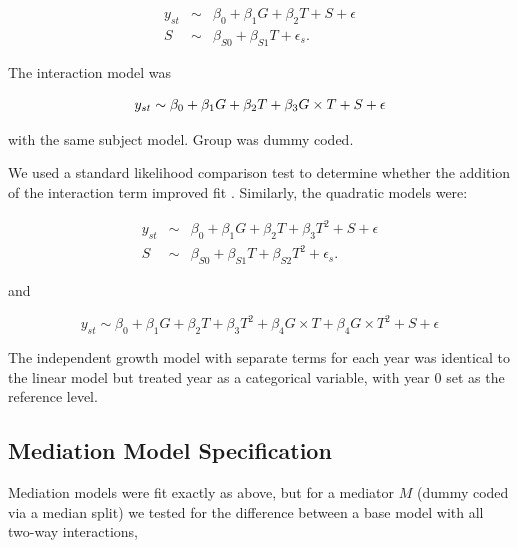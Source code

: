 \documentclass[11pt]{article}
\begin{document}
\begin{eqnarray}
y_{st} &\sim& \beta_{0} + \beta_{1} G + \beta_{2} T + S + \epsilon\\
S &\sim& \beta_{S0} + \beta_{S1} T + \epsilon_{s}.
\end{eqnarray}

\noindent The interaction model was 

\begin{equation}
y_{st} \sim \beta_{0} + \beta_{1} G + \beta_{2} T + \beta_3 G \times T +  S + \epsilon\\
\end{equation}

\noindent with the same subject model. Group was dummy coded. 

We used a standard likelihood comparison test to determine whether the addition of the interaction term improved fit \cite{pinheiro2000,barr2013}. Similarly, the quadratic models were: 

\begin{eqnarray}
  y_{st} &\sim& \beta_{0} + \beta_{1} G + \beta_{2} T + \beta_{3} T^2 + S + \epsilon\\
S &\sim& \beta_{S0} + \beta_{S1} T + \beta_{S2} T^2 + \epsilon_{s}.
\end{eqnarray}

\noindent and 

\begin{equation}
  y_{st} \sim \beta_{0} + \beta_{1} G + \beta_{2} T + \beta_{3} T^2 + \beta_4 G \times T + \beta_4 G \times T^2 + S + \epsilon
\end{equation}

\noindent The independent growth model with separate terms for each year was identical to the linear model but treated year as a categorical variable, with year 0 set as the reference level. 

\subsection{Mediation Model Specification}


Mediation models were fit exactly as above, but for a mediator $M$ (dummy coded via a median split) we tested for the difference between a base model with all two-way interactions,
\end{document}
